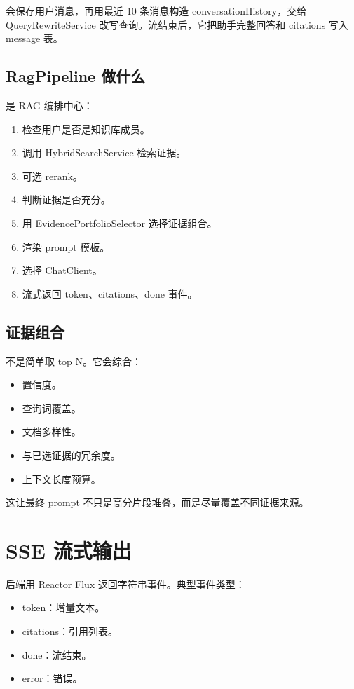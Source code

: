 \documentclass[UTF8,zihao=-4]{ctexart}
\begin{document}
 会保存用户消息，再用最近 10 条消息构造 conversationHistory，交给 QueryRewriteService 改写查询。流结束后，它把助手完整回答和 citations 写入 message 表。

\subsection{RagPipeline 做什么}

 是 RAG 编排中心：

\begin{enumerate}
  \item 检查用户是否是知识库成员。
  \item 调用 HybridSearchService 检索证据。
  \item 可选 rerank。
  \item 判断证据是否充分。
  \item 用 EvidencePortfolioSelector 选择证据组合。
  \item 渲染 prompt 模板。
  \item 选择 ChatClient。
  \item 流式返回 token、citations、done 事件。
\end{enumerate}

\subsection{证据组合}

 不是简单取 top N。它会综合：

\begin{itemize}
  \item 置信度。
  \item 查询词覆盖。
  \item 文档多样性。
  \item 与已选证据的冗余度。
  \item 上下文长度预算。
\end{itemize}

这让最终 prompt 不只是高分片段堆叠，而是尽量覆盖不同证据来源。

\section{SSE 流式输出}

后端用 Reactor Flux 返回字符串事件。典型事件类型：

\begin{itemize}
  \item token：增量文本。
  \item citations：引用列表。
  \item done：流结束。
  \item error：错误。
\end{itemize}
\end{document}
